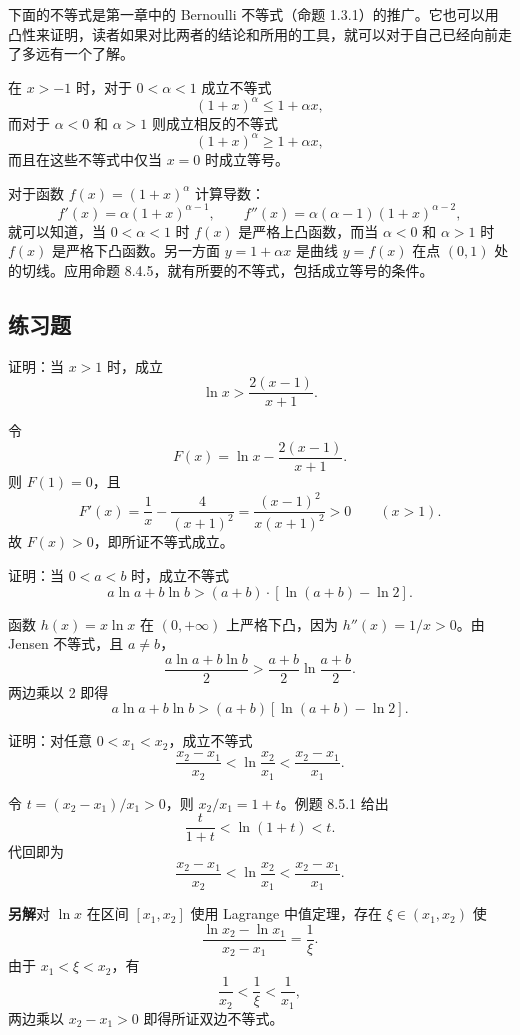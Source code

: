 下面的不等式是第一章中的 Bernoulli 不等式（命题 1.3.1）的推广。它也可以用凸性来证明，读者如果对比两者的结论和所用的工具，就可以对于自己已经向前走了多远有一个了解。

\begin{xtheorem}
在 $x>-1$ 时，对于 $0<\alpha<1$ 成立不等式
\[
  (1+x)^\alpha\le1+\alpha x,
\]
而对于 $\alpha<0$ 和 $\alpha>1$ 则成立相反的不等式
\[
  (1+x)^\alpha\ge1+\alpha x,
\]
而且在这些不等式中仅当 $x=0$ 时成立等号。
\end{xtheorem}
\begin{xproof}
对于函数 $f(x)=(1+x)^\alpha$ 计算导数：
\[
  f'(x)=\alpha(1+x)^{\alpha-1},
  \qquad
  f''(x)=\alpha(\alpha-1)(1+x)^{\alpha-2},
\]
就可以知道，当 $0<\alpha<1$ 时 $f(x)$ 是严格上凸函数，而当 $\alpha<0$ 和 $\alpha>1$ 时 $f(x)$ 是严格下凸函数。另一方面 $y=1+\alpha x$ 是曲线 $y=f(x)$ 在点 $(0,1)$ 处的切线。应用命题 8.4.5，就有所要的不等式，包括成立等号的条件。
\end{xproof}

\subsection{练习题}

\begin{xexercise}[1]
证明：当 $x>1$ 时，成立
  \[
    \ln x>\frac{2(x-1)}{x+1}.
  \]
\end{xexercise}
\begin{xsolution}
令
\[
  F(x)=\ln x-\frac{2(x-1)}{x+1}.
\]
则 $F(1)=0$，且
\[
  F'(x)=\frac1x-\frac4{(x+1)^2}
  =\frac{(x-1)^2}{x(x+1)^2}>0\qquad(x>1).
\]
故 $F(x)>0$，即所证不等式成立。
\end{xsolution}


\begin{xexercise}[2]
证明：当 $0<a<b$ 时，成立不等式
  \[
    a\ln a+b\ln b>(a+b)\cdot[\ln(a+b)-\ln2].
  \]
\end{xexercise}
\begin{xsolution}
函数 $h(x)=x\ln x$ 在 $(0,+\infty)$ 上严格下凸，因为 $h''(x)=1/x>0$。由 Jensen 不等式，且 $a\ne b$，
\[
  \frac{a\ln a+b\ln b}{2}>
  \frac{a+b}{2}\ln\frac{a+b}{2}.
\]
两边乘以 2 即得
\[
  a\ln a+b\ln b>(a+b)[\ln(a+b)-\ln2].
\]
\end{xsolution}


\begin{xexercise}[3]
证明：对任意 $0<x_1<x_2$，成立不等式
  \[
    \frac{x_2-x_1}{x_2}<\ln\frac{x_2}{x_1}<\frac{x_2-x_1}{x_1}.
  \]
\end{xexercise}
\begin{xsolution}
令 $t=(x_2-x_1)/x_1>0$，则 $x_2/x_1=1+t$。例题 8.5.1 给出
\[
  \frac{t}{1+t}<\ln(1+t)<t.
\]
代回即为
\[
  \frac{x_2-x_1}{x_2}<\ln\frac{x_2}{x_1}
  <\frac{x_2-x_1}{x_1}.
\]

\textbf{另解}\quad 对 $\ln x$ 在区间 $[x_1,x_2]$ 使用 Lagrange 中值定理，存在 $\xi\in(x_1,x_2)$ 使
\[
  \frac{\ln x_2-\ln x_1}{x_2-x_1}=\frac1\xi.
\]
由于 $x_1<\xi<x_2$，有
\[
  \frac1{x_2}<\frac1\xi<\frac1{x_1},
\]
两边乘以 $x_2-x_1>0$ 即得所证双边不等式。
\end{xsolution}


